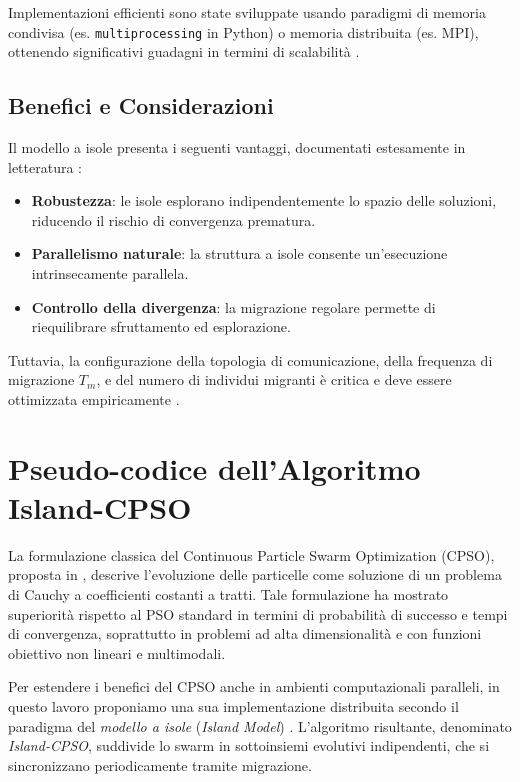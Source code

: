 \documentclass{article}
\begin{document}
Implementazioni efficienti sono state sviluppate usando paradigmi di memoria condivisa (es. \texttt{multiprocessing} in Python) o memoria distribuita (es. MPI), ottenendo significativi guadagni in termini di scalabilità \cite{alba2002parallelism, li2019openbox}.

\subsection{Benefici e Considerazioni}

Il modello a isole presenta i seguenti vantaggi, documentati estesamente in letteratura \cite{cantupaz1998survey, tomassini2005spatially}:

\begin{itemize}
    \item \textbf{Robustezza}: le isole esplorano indipendentemente lo spazio delle soluzioni, riducendo il rischio di convergenza prematura.
    \item \textbf{Parallelismo naturale}: la struttura a isole consente un'esecuzione intrinsecamente parallela.
    \item \textbf{Controllo della divergenza}: la migrazione regolare permette di riequilibrare sfruttamento ed esplorazione.
\end{itemize}

Tuttavia, la configurazione della topologia di comunicazione, della frequenza di migrazione $T_m$, e del numero di individui migranti è critica e deve essere ottimizzata empiricamente \cite{alba2002parallelism}.

\section{Pseudo-codice dell'Algoritmo Island-CPSO}

La formulazione classica del Continuous Particle Swarm Optimization (CPSO), proposta in \cite{professoressa}, descrive l'evoluzione delle particelle come soluzione di un problema di Cauchy a coefficienti costanti a tratti. Tale formulazione ha mostrato superiorità rispetto al PSO standard in termini di probabilità di successo e tempi di convergenza, soprattutto in problemi ad alta dimensionalità e con funzioni obiettivo non lineari e multimodali.

Per estendere i benefici del CPSO anche in ambienti computazionali paralleli, in questo lavoro proponiamo una sua implementazione distribuita secondo il paradigma del \textit{modello a isole} (\textit{Island Model}) \cite{tomassini2005spatially, cantupaz1998survey}. L'algoritmo risultante, denominato \textit{Island-CPSO}, suddivide lo swarm in sottoinsiemi evolutivi indipendenti, che si sincronizzano periodicamente tramite migrazione.
\end{document}
